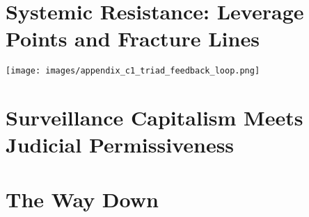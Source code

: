 \documentclass[12pt]{book}
\begin{document}
\chapter{Systemic Resistance: Leverage Points and Fracture Lines}
\texttt{[image: images/appendix\_c1\_triad\_feedback\_loop.png]}


\chapter{Surveillance Capitalism Meets Judicial Permissiveness}


\chapter{The Way Down}




\end{document}
